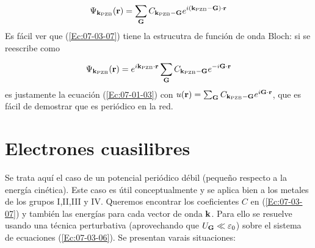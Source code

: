 \begin{eqnarray}
    \Psi_{\mathbf{k}_{\text{{\tiny PZB}}}} (\mathbf{r}) = \sum_{\mathbf{G}} C_{\mathbf{k}_{\text{{\tiny PZB}}}-\mathbf{G}} e^{i(\mathbf{k}_{\text{{\tiny PZB}}}-\mathbf{G})\cdot\mathbf{r}}  \label{Ec:07-03-07}
\end{eqnarray}
Es fácil ver que (\ref{Ec:07-03-07}) tiene la estrucutra de función de onda Bloch: si se reescribe como 

\begin{eqnarray}
    \Psi_{\mathbf{k}_{\text{{\tiny PZB}}}} (\mathbf{r}) = e^{i \mathbf{k}_{\text{{\tiny PZB}}}\cdot \mathbf{r}} \sum_{\mathbf{G}} C_{\mathbf{k}_{\text{{\tiny PZB}}}-\mathbf{G}} e^{-i \mathbf{G} \cdot \mathbf{r}} 
\end{eqnarray}
es justamente la ecuación (\ref{Ec:07-01-03}) con $u(\mathbf{r})=\sum_{\mathbf{G}} C_{\mathbf{k}_{\text{{\tiny PZB}}}-\mathbf{G}}e^{i\mathbf{G}\cdot \mathbf{r}}$, que es fácil de demostrar que es periódico en la red.

\section{Electrones cuasilibres}

Se trata aquí el caso de un potencial periódico débil (pequeño respecto a la energía cinética). Este caso es útil conceptualmente y se aplica bien a los metales de los grupos I,II,III y IV. Queremos encontrar los coeficientes $C$ en (\ref{Ec:07-03-07}) y también las energías para cada vector de onda $\mathbf{k}$. Para ello se resuelve usando una técnica perturbativa (aprovechando que $U_{\mathbf{G}} \ll \varepsilon_0$) sobre el sistema de ecuaciones (\ref{Ec:07-03-06}). Se presentan varais situaciones:

